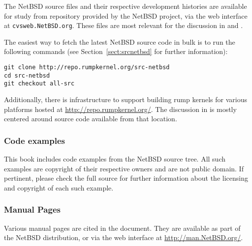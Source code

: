 The NetBSD source files and their respective development histories are
available for study from repository provided by the NetBSD project,
\eg via the web interface at \texttt{cvsweb.NetBSD.org}.  These files
are most relevant for the discussion in  and
.

The easiest way to fetch the latest NetBSD source code in bulk is to
run the following commands (see Section~\ref{sect:srcnetbsd} for further
information):

\begin{verbatim}
git clone http://repo.rumpkernel.org/src-netbsd
cd src-netbsd
git checkout all-src
\end{verbatim}

Additionally, there is infrastructure to support building rump kernels
for various platforms hosted at \url{http://repo.rumpkernel.org/}.
The discussion in  is mostly centered around
source code available from that location.

\subsubsection*{Code examples}

This book includes code examples from the NetBSD source
tree.  All such examples are copyright of their respective owners
and are not public domain.  If pertinent, please check the full
source for further information about the licensing and copyright
of each such example.

\subsubsection{Manual Pages}

Various manual pages are cited in the document.  They are available
as part of the NetBSD distribution, or via the web interface
at \url{http://man.NetBSD.org/}.
